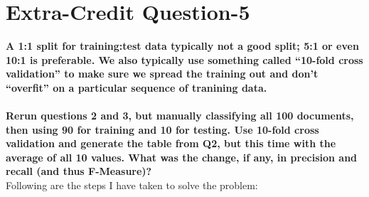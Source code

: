 \chapter{Extra-Credit Question-5}
\label{intro}

\textbf{ A 1:1 split for training:test data typically not a good split; 5:1 or even 10:1 is preferable.  We also typically use something called ``10-fold cross validation'' to make sure we spread the training out and don't ``overfit'' on a particular sequence of tranining data.\\\\
Rerun questions 2 and 3, but manually classifying all 100 documents, then using 90 for training and 10 for testing.  Use 10-fold cross validation and generate the table from Q2, but this time with the average of all 10 values.  What was the change, if any, in precision and recall (and thus F-Measure)?}\\


Following are the steps I have taken to solve the problem:
